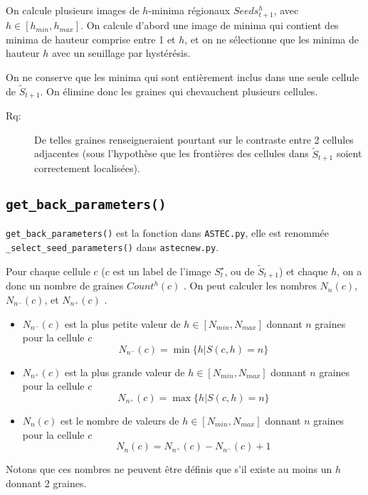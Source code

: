 \documentclass{article}
\newenvironment{remarque}{\color{red}\begin{description}\item[Rq:]}
{\end{description}\color{black}}
\begin{document}
On calcule plusieurs images de $h$-minima r\'egionaux $Seeds^{h}_{t+1}$, avec $h \in [h_{min}, h_{max}]$. On calcule d'abord une image de minima qui contient des minima de hauteur comprise entre 1 et $h$, et on ne s\'electionne que les minima de hauteur $h$ avec un seuillage par hyst\'er\'esis. 

On ne conserve que les minima qui sont enti\`erement inclus dans une seule cellule de $\tilde{S}_{t+1}$. On \'elimine donc les graines qui chevauchent plusieurs cellules. 
\begin{remarque}
De telles graines renseigneraient pourtant sur le contraste entre 2 cellules adjacentes (sous l'hypoth\`ese que les fronti\`eres des cellules dans $\tilde{S}_{t+1}$ soient correctement localis\'ees).
\end{remarque}

\subsection{\texttt{get\_back\_parameters()}}

\verb|get_back_parameters()| est la fonction dans \verb|ASTEC.py|, elle est renomm\'ee \verb|_select_seed_parameters()| dans \verb|astecnew.py|.

Pour chaque cellule $c$ ($c$ est un label de l'image $S^{\star}_t$, ou de $\tilde{S}_{t+1}$) et chaque $h$, on a donc un nombre de graines $Count^{h}(c)$ \cite[figure 2.9, page 72]{guignard:tel-01278725}. 
On peut calculer les nombres $N_{n}(c)$, $N_{n^{-}}(c)$, et $N_{n^{+}}(c)$  \cite[section 2.3.3.5, page 71]{guignard:tel-01278725}. 
\begin{itemize}
\itemsep -1ex
\item $N_{n^{-}}(c)$ est la plus petite valeur de $h \in  [N_{min}, N_{max}]$ donnant $n$ graines pour la cellule $c$
\begin{displaymath}
N_{n^{-}}(c) = \min \{ h | S(c,h) = n \}
\end{displaymath}
\item $N_{n^{+}}(c)$ est la plus grande valeur de $h \in  [N_{min}, N_{max}]$ donnant $n$ graines pour la cellule $c$
\begin{displaymath}
N_{n^{+}}(c) = \max \{ h | S(c,h) = n \}
\end{displaymath}
\item $N_{n}(c)$ est le nombre de  valeurs de $h \in  [N_{min}, N_{max}]$ donnant $n$ graines pour la cellule $c$
\begin{displaymath}
N_{n}(c) = N_{n^{+}}(c) - N_{n^{-}}(c) + 1
\end{displaymath}
\end{itemize}
Notons que ces nombres ne peuvent \^etre d\'efinis que s'il existe au moins un $h$ donnant 2 graines.
\end{document}
